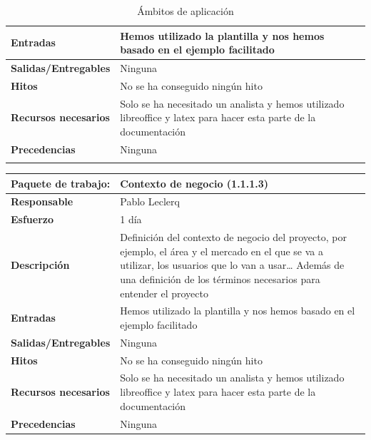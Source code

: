 \documentclass{report}
\begin{document}
\begin{center}
\begin{longtable}{|p{6cm}|p{6cm}|}
                    \hline
                    \textbf{Entradas} & Hemos utilizado la plantilla y nos hemos basado en el ejemplo facilitado\\
                    \hline
                    \textbf{Salidas/Entregables} & Ninguna\\
                    \hline
                    \textbf{Hitos} & No se ha conseguido ningún hito\\
                    \hline
                    \textbf{Recursos necesarios} & Solo se ha necesitado un analista y hemos utilizado libreoffice y latex para hacer esta parte de la documentación\\
                    \hline
                    \textbf{Precedencias} & Ninguna\\
                    \hline
                    \caption{Ámbitos de aplicación}
                \end{longtable}
                \clearpage
                \begin{longtable}{|p{6cm}|p{6cm}|}
                    \hline
                    \textbf{Paquete de trabajo:} & Contexto de negocio (1.1.1.3)\\
                    \hline
                    \textbf{Responsable} & Pablo Leclerq\\
                    \hline
                    \textbf{Esfuerzo} & 1 día\\
                    \hline
                    \textbf{Descripción} & Definición del contexto de negocio del proyecto, por ejemplo, el área y el mercado en el que se va a utilizar, los usuarios que lo van a usar… Además de una definición de los términos necesarios para entender el proyecto \\
                    \hline
                    \textbf{Entradas} & Hemos utilizado la plantilla y nos hemos basado en el ejemplo facilitado\\
                    \hline
                    \textbf{Salidas/Entregables} & Ninguna\\
                    \hline
                    \textbf{Hitos} & No se ha conseguido ningún hito\\
                    \hline
                    \textbf{Recursos necesarios} & Solo se ha necesitado un analista y hemos utilizado libreoffice y latex para hacer esta parte de la documentación\\
                    \hline
                    \textbf{Precedencias} & Ninguna\\

\end{longtable}
\end{center}
\end{document}
